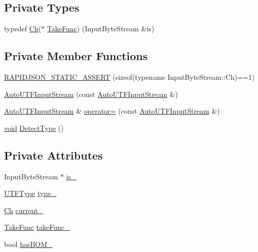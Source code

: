 \subsection*{Private Types}
\begin{DoxyCompactItemize}
\item 
typedef \hyperlink{classAutoUTFInputStream_a3bb3eb46f2c20404a7ac21963cfe348f}{Ch}($\ast$ \hyperlink{classAutoUTFInputStream_a106a0af4b098cc88e1dba285b8f563ae}{Take\+Func}) (Input\+Byte\+Stream \&is)
\end{DoxyCompactItemize}
\subsection*{Private Member Functions}
\begin{DoxyCompactItemize}
\item 
\hyperlink{classAutoUTFInputStream_a74f5efc9cfc9e9978d81a3282abf17da}{R\+A\+P\+I\+D\+J\+S\+O\+N\+\_\+\+S\+T\+A\+T\+I\+C\+\_\+\+A\+S\+S\+E\+RT} (sizeof(typename Input\+Byte\+Stream\+::\+Ch)==1)
\item 
\hyperlink{classAutoUTFInputStream_a54001615e50304edf4a4ac1b2931f5d7}{Auto\+U\+T\+F\+Input\+Stream} (const \hyperlink{classAutoUTFInputStream}{Auto\+U\+T\+F\+Input\+Stream} \&)
\item 
\hyperlink{classAutoUTFInputStream}{Auto\+U\+T\+F\+Input\+Stream} \& \hyperlink{classAutoUTFInputStream_a043b85d05491e8908611054b37aec38b}{operator=} (const \hyperlink{classAutoUTFInputStream}{Auto\+U\+T\+F\+Input\+Stream} \&)
\item 
\hyperlink{imgui__impl__opengl3__loader_8h_ac668e7cffd9e2e9cfee428b9b2f34fa7}{void} \hyperlink{classAutoUTFInputStream_ae7ec4841acf560cdaee9204d6ad5dec8}{Detect\+Type} ()
\end{DoxyCompactItemize}
\subsection*{Private Attributes}
\begin{DoxyCompactItemize}
\item 
Input\+Byte\+Stream $\ast$ \hyperlink{classAutoUTFInputStream_aee206b352000902d02dac147761a61dc}{is\+\_\+}
\item 
\hyperlink{encodings_8h_ac9448aedf514a5bb509bae73a9ce4e58}{U\+T\+F\+Type} \hyperlink{classAutoUTFInputStream_aef307895f82bc15a7a37ded277aefe2e}{type\+\_\+}
\item 
\hyperlink{classAutoUTFInputStream_a3bb3eb46f2c20404a7ac21963cfe348f}{Ch} \hyperlink{classAutoUTFInputStream_a1b89f7dca4c3c462347bf7bc066a2fe1}{current\+\_\+}
\item 
\hyperlink{classAutoUTFInputStream_a106a0af4b098cc88e1dba285b8f563ae}{Take\+Func} \hyperlink{classAutoUTFInputStream_a8996755d783dcae9049d9f1ad96391fb}{take\+Func\+\_\+}
\item 
bool \hyperlink{classAutoUTFInputStream_ac329c186f5b0dc82433effecaaf1bf46}{has\+B\+O\+M\+\_\+}
\end{DoxyCompactItemize}


